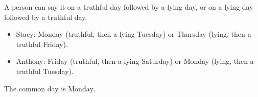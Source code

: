 A person can say it on a truthful day followed by a lying day, or on a lying day followed by a truthful day.
\begin{itemize}
\item Stacy: Monday (truthful, then a lying Tuesday) or Thursday (lying, then a truthful Friday).
\item Anthony: Friday (truthful, then a lying Saturday) or Monday (lying, then a truthful Tuesday).
\end{itemize}
The common day is $\boxed{\text{Monday}}$.
